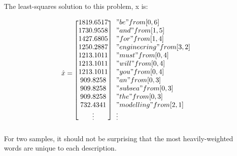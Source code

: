 \documentclass[12pt]{article}
\begin{document}
The least-squares solution to this problem, x is:
\newline

\begin{equation*}
\hat{x} = 
\begin{blockarray}{[c] l}
1819.6517 & "be" from [0, 6] \\
1730.9558 & "and" from [1, 5] \\
1427.6805 & "for" from [1, 4] \\
1250.2887 & "engineering" from [3, 2] \\
1213.1011 & "must" from [0, 4] \\
1213.1011 & "will" from [0, 4] \\
1213.1011 & "you" from [0, 4] \\
909.8258 & "an" from [0, 3] \\
909.8258 & "subsea" from [0, 3] \\
909.8258 & "the" from [0, 3] \\
732.4341 & "modelling" from [2, 1] \\
\vdots & \vdots
\end{blockarray}
\end{equation*}
For two samples, it should not be surprising that the most heavily-weighted words are unique to each description.
\end{document}
